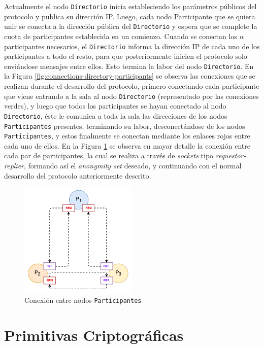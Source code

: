 Actualmente el nodo \texttt{Directorio} inicia estableciendo los 
parámetros públicos del protocolo y publica su dirección IP. Luego, cada nodo 
Participante que se quiera unir se conecta a la dirección pública del 
\texttt{Directorio} y espera que se complete la cuota de participantes 
establecida en un comienzo. Cuando se conectan los $n$ participantes 
necesarios, el \texttt{Directorio} informa la dirección IP de cada uno de los 
participantes a todo el resto, para que posteriormente inicien el protocolo 
solo enviándose mensajes entre ellos. Esto termina la labor del nodo 
\texttt{Directorio}. En la Figura \ref{fig:connections-directory-participants} 
se observa las conexiones que se realizan durante el desarrollo del protocolo, 
primero conectando cada participante que viene entrando a la sala al nodo 
\texttt{Directorio} (representado por las conexiones verdes), y luego que 
todos los participantes se hayan conectado al nodo \texttt{Directorio}, éste 
le comunica a toda la sala las direcciones de los nodos \texttt{Participantes} 
presentes, terminando su labor, desconectándose de los nodos 
\texttt{Participantes}, y estos finalmente se conectan mediante los enlaces 
rojos entre cada uno de ellos. En la Figura \ref{fig:connections-participants} 
se observa en mayor detalle la conexión entre cada par de participantes, la 
cual se realiza a través de \emph{sockets} tipo \emph{requestor-replier}, 
formando así el \emph{anonymity set} deseado, y continuando con el normal 
desarrollo del protocolo anteriormente descrito.

\begin{figure}[H]
  \centering
    \includegraphics[width=0.5\textwidth]{imagenes/participants_connection.pdf}
  \caption{Conexión entre nodos \texttt{Participantes}}
  \label{fig:connections-participants}
\end{figure}

\section{Primitivas Criptográficas}

